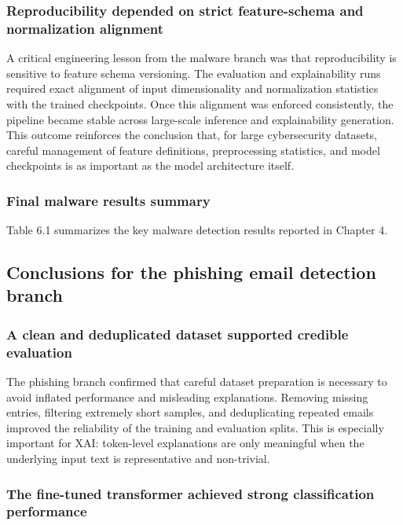 \documentclass[conference]{IEEEtran}
\begin{document}
\subsubsection{Reproducibility depended on strict feature-schema and normalization alignment}

A critical engineering lesson from the malware branch was that reproducibility is sensitive to feature schema versioning. The evaluation and explainability runs required exact alignment of input dimensionality and normalization statistics with the trained checkpoints. Once this alignment was enforced consistently, the pipeline became stable across large-scale inference and explainability generation. This outcome reinforces the conclusion that, for large cybersecurity datasets, careful management of feature definitions, preprocessing statistics, and model checkpoints is as important as the model architecture itself.

\subsubsection{Final malware results summary}

Table 6.1 summarizes the key malware detection results reported in Chapter 4.

\subsection{Conclusions for the phishing email detection branch}

\subsubsection{A clean and deduplicated dataset supported credible evaluation}

The phishing branch confirmed that careful dataset preparation is necessary to avoid inflated performance and misleading explanations. Removing missing entries, filtering extremely short samples, and deduplicating repeated emails improved the reliability of the training and evaluation splits. This is especially important for XAI: token-level explanations are only meaningful when the underlying input text is representative and non-trivial.

\subsubsection{The fine-tuned transformer achieved strong classification performance}
\end{document}
